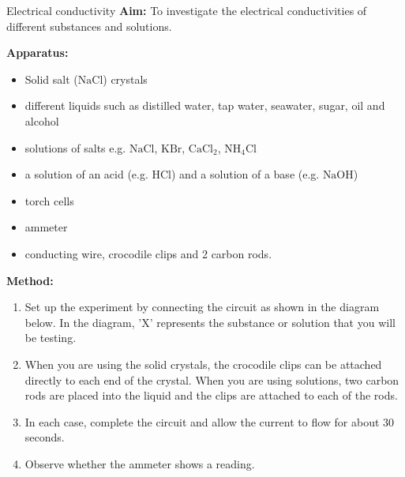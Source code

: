             \begin{g_experiment}{Electrical conductivity }
            \nopagebreak
            \label{m38720*id339425}\noindent{}\textbf{Aim:}
          \newline
To investigate the electrical conductivities of different substances and solutions.\par 
        \label{m38720*id339438}\noindent{}\textbf{Apparatus:}
\begin{itemize}[noitemsep]
\item Solid salt ($\text{NaCl}$) crystals
\item different liquids such as distilled water, tap water, seawater, sugar, oil and alcohol
\item solutions of salts e.g. $\text{NaCl}$, $\text{KBr}$, $\text{CaCl}_{2}$, $\text{NH}_{4}\text{Cl}$
\item a solution of an acid (e.g. $\text{HCl}$) and a solution of a base (e.g. $\text{NaOH}$)
\item torch cells
\item ammeter
\item conducting wire, crocodile clips and 2 carbon rods.
\end{itemize}
        \label{m38720*eip-456}
	\par
      \label{m38720*id334346}\noindent{}\textbf{Method:}
\begin{enumerate}[noitemsep, label=\textbf{\arabic*}.]
\item Set up the experiment by connecting the circuit as shown in the diagram below. In the diagram, 'X' represents the substance or solution that you will be testing.
\item When you are using the solid crystals, the crocodile clips can be attached directly to each end of the crystal. When you are using solutions, two carbon rods are placed into the liquid and the clips are attached to each of the rods.
\item In each case, complete the circuit and allow the current to flow for about 30 seconds. 
\item Observe whether the ammeter shows a reading.
\end{enumerate}
        \label{m38720*id334362}
\begin{minipage}{.5\textwidth}
    \setcounter{subfigure}{0}
	\begin{figure}[H] %
\begin{center}
\end{center}
\end{figure}
\end{minipage}
\end{g_experiment}
